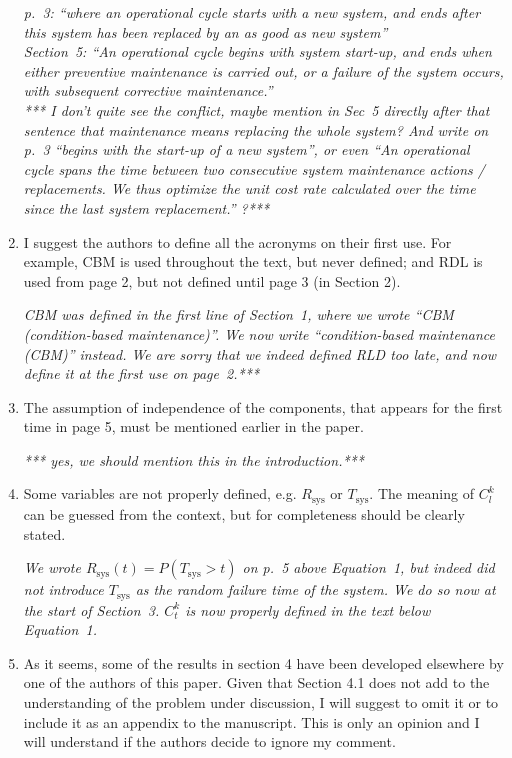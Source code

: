\documentclass[authoryear]{elsarticle}
\newcommand{\Tsys}{T_\text{sys}}
\newcommand{\Rsys}{R_\text{sys}}
\begin{document}
\begin{enumerate}
\smallskip

\emph{p.~3: ``where an operational cycle starts with a new system,
and ends after this system has been replaced by an as good as new system''\\
Section~5: ``An operational cycle begins with system start-up,
and ends when either preventive maintenance is carried out, or a failure of the system occurs,
with subsequent corrective maintenance.''\\
*** I don't quite see the conflict, maybe mention in Sec~5 directly after that sentence that maintenance means replacing the whole system?
And write on p.~3 ``begins with the start-up of a new system'', or even
``An operational cycle spans the time between two consecutive system maintenance actions / replacements.
We thus optimize the unit cost rate calculated over the time since the last system replacement.''
?***}

\item I suggest the authors to define all the acronyms on their first use. For example, CBM is used throughout the text, but never defined; and RDL is used from page 2, but not defined until page 3 (in Section 2).

\smallskip

\emph{CBM was defined in the first line of Section~1, where we wrote ``CBM (condition-based maintenance)''.
We now write ``condition-based maintenance (CBM)'' instead.
We are sorry that we indeed defined RLD too late, and now define it at the first use on page~2.***}

\item The assumption of independence of the components, that appears for the first time in page 5, must be mentioned earlier in the paper.

\smallskip

\emph{*** yes, we should mention this in the introduction.***}

\item Some variables are not properly defined, e.g. $\Rsys$ or $\Tsys$. The meaning of $C^k_l$ can be guessed from the context, but for completeness should be clearly stated.

\smallskip

\emph{We wrote $\Rsys(t) = P(\Tsys > t)$ on p.~5 above Equation~1,
but indeed did not introduce $\Tsys$ as the random failure time of the system.
We do so now at the start of Section~3.
$C^k_t$ is now properly defined in the text below Equation~1.}

\item As it seems, some of the results in section 4 have been developed elsewhere by one of the authors of this paper. Given that Section 4.1 does not add to the understanding of the problem under discussion, I will suggest to omit it or to include it as an appendix to the manuscript. This is only an opinion and I will understand if the authors decide to ignore my comment.


\end{enumerate}
\end{document}
